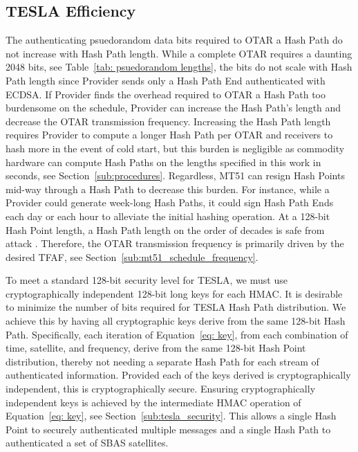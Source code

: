 \documentclass[letterpaper,times]{IONconf/IONconf}
\begin{document}
	\subsection{TESLA Efficiency} \label{sub:tesla_efficiency}

		The authenticating psuedorandom data bits required to OTAR a Hash Path do not increase with Hash Path length.
		While a complete OTAR requires a daunting 2048 bits, see Table~\ref{tab: psuedorandom lengths}, the bits do not scale with Hash Path length since Provider sends only a Hash Path End authenticated with ECDSA.
		If Provider finds the overhead required to OTAR a Hash Path too burdensome on the schedule, Provider can increase the Hash Path's length and decrease the OTAR transmission frequency.
		Increasing the Hash Path length requires Provider to compute a longer Hash Path per OTAR and receivers to hash more in the event of cold start, but this burden is negligible as commodity hardware can compute Hash Paths on the lengths specified in this work in seconds, see Section~\ref{sub:procedures}.
		Regardless, MT51 can resign Hash Points mid-way through a Hash Path to decrease this burden.
		For instance, while a Provider could generate week-long Hash Paths, it could sign Hash Path Ends each day or each hour to alleviate the initial hashing operation.
		At a 128-bit Hash Point length, a Hash Path length on the order of decades is safe from attack \cite{Neish_Dissertation}.
		Therefore, the OTAR transmission frequency is primarily driven by the desired TFAF, see Section~\ref{sub:mt51_schedule_frequency}.

		To meet a standard 128-bit security level for TESLA, we must use cryptographically independent 128-bit long keys for each HMAC.
		It is desirable to minimize the number of bits required for TESLA Hash Path distribution.
		We achieve this by having all cryptographic keys derive from the same 128-bit Hash Path.
		Specifically, each iteration of Equation~\eqref{eq: key}, from each combination of time, satellite, and frequency, derive from the same 128-bit Hash Point distribution, thereby not needing a separate Hash Path for each stream of authenticated information.
		Provided each of the keys derived is cryptographically independent, this is cryptographically secure.
		Ensuring cryptographically independent keys is achieved by the intermediate HMAC operation of Equation~\eqref{eq: key}, see Section~\ref{sub:tesla_security}.
		This allows a single Hash Point to securely authenticated multiple messages and a single Hash Path to authenticated a set of SBAS satellites.
\end{document}
